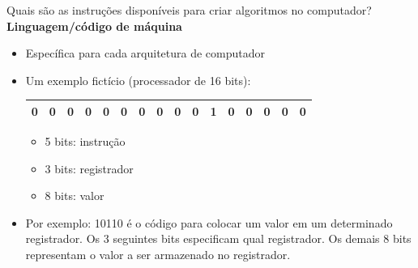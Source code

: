 \documentclass[portuguese,10pt,xcolor=table]{bredelebeamer}
\begin{document}
	\begin{frame} 
		Quais são as instruções disponíveis para criar algoritmos no computador?\\
		\textbf{Linguagem/código de máquina}
		\begin{itemize}
			\item Específica para cada arquitetura de computador
			\item Um exemplo fictício (processador de 16 bits):
		\tiny
		 \setlength{\tabcolsep}{0pt}
		\begin{table}
			\begin{center}
				  \begin{tabular}{|c|c|c|c|c|c|c|c|c|c|c|c|c|c|c|c|}
					\hline
					\colorbox{red!40}{0} & 
					\colorbox{red!40}{0} & 
					\colorbox{red!40}{0} & 
					\colorbox{red!40}{0} & 
					\colorbox{red!40}{0} & 
					\colorbox{gray!40}{0} & 
					\colorbox{gray!40}{0} & 
					\colorbox{gray!40}{0} & 
					\colorbox{blue!40}{0} & 
					\colorbox{blue!40}{0} & 
					\colorbox{blue!40}{1} & 
					\colorbox{blue!40}{0} & 
					\colorbox{blue!40}{0} & 
					\colorbox{blue!40}{0} & 
					\colorbox{blue!40}{0} & 
					\colorbox{blue!40}{0} \\
						\hline
				  \end{tabular}
			\end{center}
		\end{table}
		\normalsize
		\begin{itemize}
			\item 5 bits: instrução
			\item 3 bits: registrador
			\item 8 bits: valor
		\end{itemize}
		\item Por exemplo: 10110 é o código para colocar um valor em um determinado registrador. Os 3 seguintes bits especificam qual registrador. Os demais 8 bits representam o valor a ser armazenado no registrador.
		\end{itemize}
	\end{frame}
\end{document}
